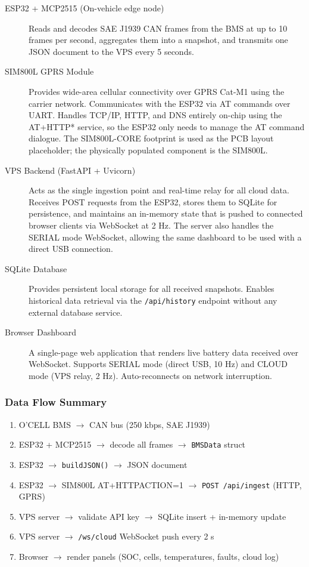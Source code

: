 \begin{description}
    \item[ESP32 + MCP2515 (On-vehicle edge node)]
    Reads and decodes SAE J1939 CAN frames from the BMS at up to 10 frames per second, aggregates them into a snapshot, and transmits one JSON document to the VPS every 5 seconds.

    \item[SIM800L GPRS Module]
    Provides wide-area cellular connectivity over GPRS Cat-M1 using the carrier network. Communicates with the ESP32 via AT commands over UART. Handles TCP/IP, HTTP, and DNS entirely on-chip using the AT+HTTP* service, so the ESP32 only needs to manage the AT command dialogue. The SIM800L-CORE footprint is used as the PCB layout placeholder; the physically populated component is the SIM800L.

    \item[VPS Backend (FastAPI + Uvicorn)]
    Acts as the single ingestion point and real-time relay for all cloud data. Receives POST requests from the ESP32, stores them to SQLite for persistence, and maintains an in-memory state that is pushed to connected browser clients via WebSocket at 2 Hz. The server also handles the SERIAL mode WebSocket, allowing the same dashboard to be used with a direct USB connection.

    \item[SQLite Database]
    Provides persistent local storage for all received snapshots. Enables historical data retrieval via the \texttt{/api/history} endpoint without any external database service.

    \item[Browser Dashboard]
    A single-page web application that renders live battery data received over WebSocket. Supports SERIAL mode (direct USB, 10 Hz) and CLOUD mode (VPS relay, 2 Hz). Auto-reconnects on network interruption.
\end{description}

\subsubsection{Data Flow Summary}

\begin{enumerate}
    \item O'CELL BMS $\rightarrow$ CAN bus (250 kbps, SAE J1939)
    \item ESP32 + MCP2515 $\rightarrow$ decode all frames $\rightarrow$ \texttt{BMSData} struct
    \item ESP32 $\rightarrow$ \texttt{buildJSON()} $\rightarrow$ JSON document
    \item ESP32 $\rightarrow$ SIM800L AT+HTTPACTION=1 $\rightarrow$ \texttt{POST /api/ingest} (HTTP, GPRS)
    \item VPS server $\rightarrow$ validate API key $\rightarrow$ SQLite insert + in-memory update
    \item VPS server $\rightarrow$ \texttt{/ws/cloud} WebSocket push every 2 s
    \item Browser $\rightarrow$ render panels (SOC, cells, temperatures, faults, cloud log)
\end{enumerate}

